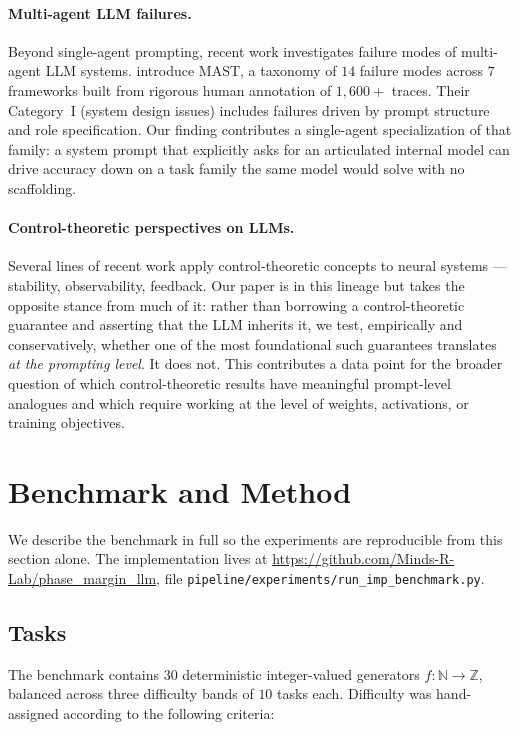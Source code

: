 \documentclass[11pt]{article}
\begin{document}
\paragraph{Multi-agent LLM failures.}  Beyond single-agent
prompting, recent work investigates failure modes of multi-agent
LLM systems.  \citet{cemri2025why} introduce MAST, a taxonomy of
$14$ failure modes across $7$ frameworks built from rigorous
human annotation of $1{,}600+$ traces.  Their Category~I (system
design issues) includes failures driven by prompt structure and
role specification.  Our finding contributes a single-agent
specialization of that family: a system prompt that explicitly
asks for an articulated internal model can drive accuracy down on
a task family the same model would solve with no scaffolding.

\paragraph{Control-theoretic perspectives on LLMs.}
Several lines of recent work apply control-theoretic concepts to
neural systems --- stability, observability, feedback.  Our paper
is in this lineage but takes the opposite stance from much of it:
rather than borrowing a control-theoretic guarantee and asserting
that the LLM inherits it, we test, empirically and conservatively,
whether one of the most foundational such guarantees translates
\emph{at the prompting level}.  It does not.  This contributes a
data point for the broader question of which control-theoretic
results have meaningful prompt-level analogues and which require
working at the level of weights, activations, or training
objectives.

\section{Benchmark and Method}
\label{sec:method}

We describe the benchmark in full so the experiments are
reproducible from this section alone.  The implementation lives at
\url{https://github.com/Minds-R-Lab/phase_margin_llm}, file
\verb|pipeline/experiments/run_imp_benchmark.py|.

\subsection{Tasks}
\label{sec:tasks}

The benchmark contains $30$ deterministic integer-valued generators
$f \colon \mathbb{N} \to \mathbb{Z}$, balanced across three
difficulty bands of $10$ tasks each.  Difficulty was hand-assigned
according to the following criteria:
\end{document}
